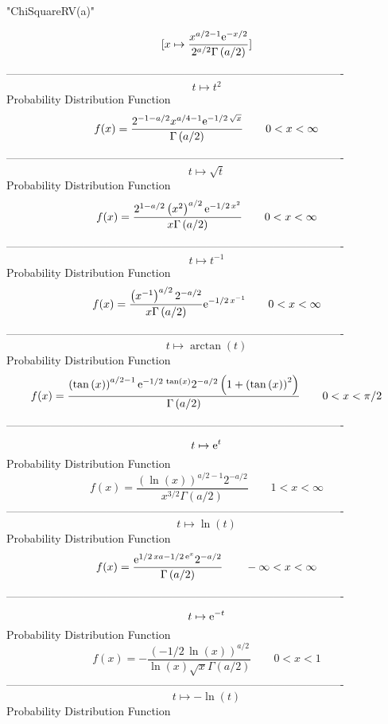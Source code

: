 \documentclass[12pt]{article}
\begin{document}
 
                              "ChiSquareRV(a)"

$$[x\mapsto {\frac {{x}^{a/2-1}{{\rm e}^{-x/2}}}{{2}^{a/2}\Gamma \left( 
a/2 \right) }}]
$$-------------------------------------------------------------------------------------------  \\$$t\mapsto {t}^{2}
$$Probability Distribution Function 
$$  f(x)={\frac {{2}^{-1-a/2}{x}^{a/4-1}{{\rm e}^{-1/2\,\sqrt {x}}}}{\Gamma
 \left( a/2 \right) }}
 \qquad0
 < x < \infty 
$$-------------------------------------------------------------------------------------------  \\$$t\mapsto \sqrt {t}
$$Probability Distribution Function 
$$  f(x)={\frac {{2}^{1-a/2} \left( {x}^{2} \right) ^{a/2}{{\rm e}^{-1/2\,{x}^{
2}}}}{x\Gamma \left( a/2 \right) }}
 \qquad0
 < x < \infty 
$$-------------------------------------------------------------------------------------------  \\$$t\mapsto {t}^{-1}
$$Probability Distribution Function 
$$  f(x)={\frac { \left( {x}^{-1} \right) ^{a/2}{2}^{-a/2}}{x\Gamma \left( a/2
 \right) }{{\rm e}^{-1/2\,{x}^{-1}}}}
 \qquad0
 < x < \infty 
$$-------------------------------------------------------------------------------------------  \\$$t\mapsto \arctan \left( t \right) 
$$Probability Distribution Function 
$$  f(x)={\frac { \left( \tan \left( x \right)  \right) ^{a/2-1}{{\rm e}^{-1/2
\,\tan \left( x \right) }}{2}^{-a/2} \left( 1+ \left( \tan \left( x
 \right)  \right) ^{2} \right) }{\Gamma \left( a/2 \right) }}
 \qquad0
 < x < \pi/2
$$-------------------------------------------------------------------------------------------  \\$$t\mapsto {{\rm e}^{t}}
$$Probability Distribution Function 
$$  f(x)={\frac { \left( \ln  \left( x \right)  \right) ^{a/2-1}{2}^{-a/2}}{{x}
^{3/2}\Gamma \left( a/2 \right) }}
 \qquad1
 < x < \infty 
$$-------------------------------------------------------------------------------------------  \\$$t\mapsto \ln  \left( t \right) 
$$Probability Distribution Function 
$$  f(x)={\frac {{{\rm e}^{1/2\,xa-1/2\,{{\rm e}^{x}}}}{2}^{-a/2}}{\Gamma
 \left( a/2 \right) }}
 \qquad-\infty 
 < x < \infty 
$$-------------------------------------------------------------------------------------------  \\$$t\mapsto {{\rm e}^{-t}}
$$Probability Distribution Function 
$$  f(x)=-{\frac { \left( -1/2\,\ln  \left( x \right)  \right) ^{a/2}}{\ln 
 \left( x \right) \sqrt {x}\Gamma \left( a/2 \right) }}
 \qquad0
 < x < 1
$$-------------------------------------------------------------------------------------------  \\$$t\mapsto -\ln  \left( t \right) 
$$Probability Distribution Function 
\end{document}

